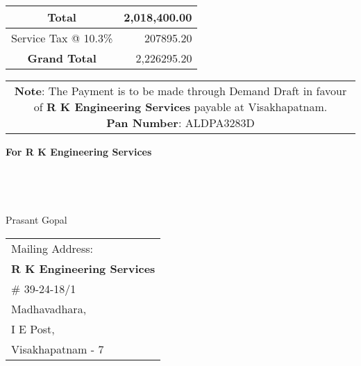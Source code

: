 \documentclass[11pt]{article}
\begin{document}
\vspace*{0.5cm}

\hspace*{11.15cm}
\begin{tabular}{|c|r|}
\hline
Total & 2,018,400.00 \\
\hline
Service Tax @ 10.3\% & 207895.20 \\
\hline
{\bf Grand Total} & 2,226295.20 \\
\hline
\end{tabular}

\vspace*{-1 cm}
\begin{tabular}{c}
\parbox{4in}{ {\bf Note}: The Payment is to be made through Demand Draft in favour of {\bf R K Engineering Services} payable at Visakhapatnam. \\
{\noindent \bf Pan Number}:  ALDPA3283D }\\
\end{tabular}
\vspace*{55pt}


{\bf For  R K Engineering Services } \\ \\ \\ \\ \\
 \hspace*{0.6cm}Prasant Gopal
\vspace*{-71pt}
\begin{flushright}
\begin{tabular}{l}
Mailing Address:\\
{\bf R K Engineering Services}\\
\# 39-24-18/1\\
Madhavadhara, \\ 
I E Post, \\
Visakhapatnam - 7\\
\end{tabular}
\end{flushright}
\end{document}
